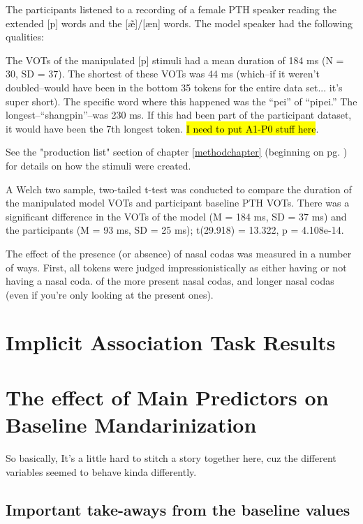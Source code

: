 The participants listened to a recording of a female PTH speaker reading the extended [p] words and the [\~{\ae}]/[\ae n] words. The model speaker had the following qualities:

The VOTs of the manipulated [p] stimuli had a mean duration of 184 ms (N = 30, SD = 37). The shortest of these VOTs was 44 ms (which--if it weren't doubled--would have been in the bottom 35 tokens for the entire data set... it's super short). The specific word where this happened was the ``pei'' of ``pipei.'' The longest--``shangpin''--was 230 ms. If this had been part of the participant dataset, it would have been the 7th longest token. \hl{I need to put A1-P0 stuff here}.%

See the "production list" section of chapter \ref{methodchapter} (beginning on pg. \pageref{para:prodList}) for details on how the stimuli were created.

A Welch two sample, two-tailed t-test was conducted to compare the duration of the manipulated model VOTs and participant baseline PTH VOTs. There was a significant difference in the VOTs of the model (M = 184 ms, SD = 37 ms) and the participants (M = 93 ms, SD = 25 ms); t(29.918) = 13.322, p = 4.108e-14.

The effect of the presence (or absence) of nasal codas was measured in a number of ways. First, all tokens were judged impressionistically as either having or not having a nasal coda. of the more present nasal codas, and longer nasal codas (even if you're only looking at the present ones).


\section{Implicit Association Task Results}
\label{sec:IATresults}

\section{The effect of Main Predictors on Baseline Mandarinization}
\label{sec:basemandfactors}
So basically, It's a little hard to stitch a story together here, cuz the different variables seemed to behave kinda differently. 
\subsection{Important take-aways from the baseline values}

